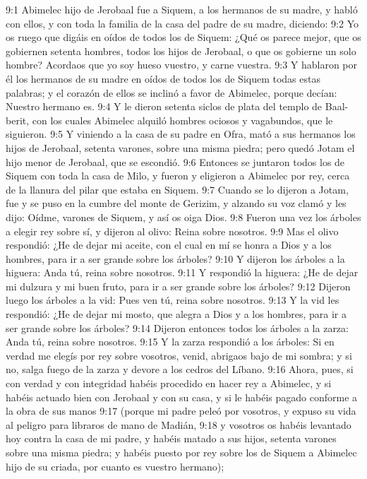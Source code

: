 9:1 Abimelec hijo de Jerobaal fue a Siquem, a los hermanos de su madre, y habló con ellos, y con toda la familia de la casa del padre de su madre, diciendo:  
9:2 Yo os ruego que digáis en oídos de todos los de Siquem: ¿Qué os parece mejor, que os gobiernen setenta hombres, todos los hijos de Jerobaal, o que os gobierne un solo hombre? Acordaos que yo soy hueso vuestro, y carne vuestra.  
9:3 Y hablaron por él los hermanos de su madre en oídos de todos los de Siquem todas estas palabras; y el corazón de ellos se inclinó a favor de Abimelec, porque decían: Nuestro hermano es.  
9:4 Y le dieron setenta siclos de plata   del templo de Baal-berit, con los cuales Abimelec alquiló hombres ociosos y vagabundos, que le siguieron.  
9:5 Y viniendo a la casa de su padre en Ofra, mató a sus hermanos los hijos de Jerobaal, setenta varones, sobre una misma piedra; pero quedó Jotam el hijo menor de Jerobaal, que se escondió.  
9:6 Entonces se juntaron todos los de Siquem con toda la casa de Milo, y fueron y eligieron a Abimelec por rey, cerca de la llanura del pilar que estaba en Siquem.  
9:7 Cuando se lo dijeron a Jotam, fue y se puso en la cumbre del monte de Gerizim, y alzando su voz clamó y les dijo: Oídme, varones de Siquem, y así os oiga Dios.  
9:8 Fueron una vez los árboles a elegir rey sobre sí, y dijeron al olivo: Reina sobre nosotros.  
9:9 Mas el olivo respondió: ¿He de dejar mi aceite, con el cual en mí se honra a Dios y a los hombres, para ir a ser grande sobre los árboles?  
9:10 Y dijeron los árboles a la higuera: Anda tú, reina sobre nosotros.  
9:11 Y respondió la higuera: ¿He de dejar mi dulzura y mi buen fruto, para ir a ser grande sobre los árboles?  
9:12 Dijeron luego los árboles a la vid: Pues ven tú, reina sobre nosotros.  
9:13 Y la vid les respondió: ¿He de dejar mi mosto, que alegra a Dios y a los hombres, para ir a ser grande sobre los árboles?  
9:14 Dijeron entonces todos los árboles a la zarza: Anda tú, reina sobre nosotros.  
9:15 Y la zarza respondió a los árboles: Si en verdad me elegís por rey sobre vosotros, venid, abrigaos bajo de mi sombra; y si no, salga fuego de la zarza y devore a los cedros del Líbano.  
9:16 Ahora, pues, si con verdad y con integridad habéis procedido en hacer rey a Abimelec, y si habéis actuado bien con Jerobaal y con su casa, y si le habéis pagado conforme a la obra de sus manos  
9:17 (porque mi padre peleó por vosotros, y expuso su vida al peligro para libraros de mano de Madián,  
9:18 y vosotros os habéis levantado hoy contra la casa de mi padre, y habéis matado a sus hijos, setenta varones sobre una misma piedra; y habéis puesto por rey sobre los de Siquem a Abimelec hijo de su criada, por cuanto es vuestro hermano);  
